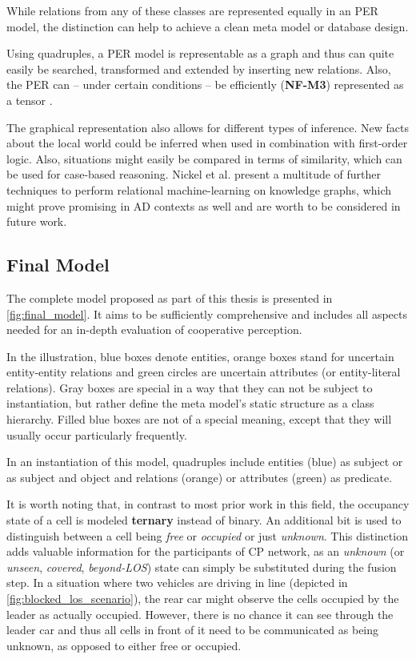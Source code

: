 While relations from any of these classes are represented equally in an PER model, the distinction can help to achieve a clean meta model or database design.
\par
\bigskip

Using quadruples, a PER model is representable as a graph and thus can quite easily be searched, transformed and extended by inserting new relations. Also, the PER can – under certain conditions – be efficiently (\textbf{NF-M3}) represented as a tensor \cite{Petrich2018}.

The graphical representation also allows for different types of inference. New facts about the local world could be inferred when used in combination with first-order logic. Also, situations might easily be compared in terms of similarity, which can be used for case-based reasoning. Nickel et al. \cite{Nickel2016} present a multitude of further techniques to perform relational machine-learning on knowledge graphs, which might prove promising in AD contexts as well and are worth to be considered in future work.

\subsection{Final Model}
\label{subsec:concept_design:the_final_model}
The complete model proposed as part of this thesis is presented in \cref{fig:final_model}. It aims to be sufficiently comprehensive and includes all aspects needed for an in-depth evaluation of cooperative perception. 

In the illustration, blue boxes denote entities, orange boxes stand for uncertain entity-entity relations and green circles are uncertain attributes (or entity-literal relations). Gray boxes are special in a way that they can not be subject to instantiation, but rather define the meta model's static structure as a class hierarchy. Filled blue boxes are not of a special meaning, except that they will usually occur particularly frequently.

In an instantiation of this model, quadruples include entities (blue) as subject or as subject and object and relations (orange) or attributes (green) as predicate. 

It is worth noting that, in contrast to most prior work in this field, the occupancy state of a cell is modeled \textbf{ternary} instead of binary. An additional bit is used to distinguish between a cell being \textit{free} or \textit{occupied} or just \textit{unknown}. This distinction adds valuable information for the participants of CP network, as an  \textit{unknown} (or \textit{unseen}, \textit{covered}, \textit{beyond-LOS}) state can simply be substituted during the fusion step. In a situation where two vehicles are driving in line (depicted in \cref{fig:blocked_los_scenario}), the rear car might observe the cells occupied by the leader as actually occupied. However, there is no chance it can see through the leader car and thus all cells in front of it need to be communicated as being unknown, as opposed to either free or occupied.

